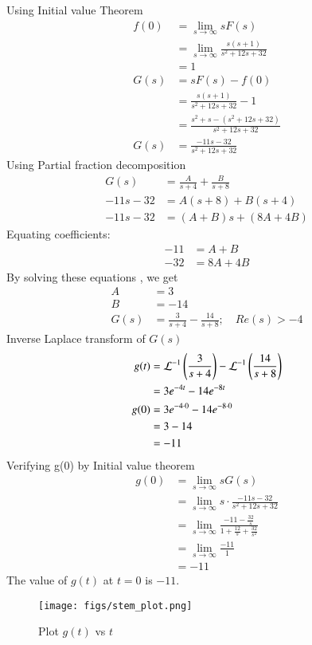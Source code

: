\documentclass[journal,12pt,twocolumn]{IEEEtran}
\theoremstyle{remark}
\begin{document}
Using Initial value Theorem 
\begin{align}
    f(0) &= \lim_{s \to \infty} sF(s) \\
         &= \lim_{s \to \infty} \frac{s(s+1)}{s^2 + 12s + 32} \\
         &= 1 \\
    G(s) &= sF(s) - f(0) \\
         &= \frac{s(s+1)}{s^2 + 12s + 32} - 1 \\
         &= \frac{s^2 + s - (s^2 + 12s + 32)}{s^2 + 12s + 32} \\
         G(s) &= \frac{-11s - 32}{s^2 + 12s + 32} 
\end{align}
Using Partial fraction decomposition 
\begin{align}
      G(s)   &= \frac{A}{s+4} + \frac{B}{s+8}  \\
    -11s - 32 &= A(s+8) + B(s+4) \\
    -11s - 32 &= (A + B)s + (8A + 4B)
\end{align}
Equating coefficients:
\begin{align}
     -11 &= A + B \\
    -32 &= 8A + 4B
\end{align}
By solving these equations , we get 
\begin{align}
    A &= 3 \\
    B &= -14 \\
    G(s) &=\frac{3}{s+4} - \frac{14}{s+8} ; \quad Re(s) > -4
\end{align}
Inverse Laplace transform of $G(s)$ 
\begin{align}
g(t) &=\mathcal{L}^{-1}\left(\frac{3}{s+4}\right) -\mathcal{L}^{-1}\left(\frac{14}{s+8}\right) \\
   &= 3e^{-4t} - 14e^{-8t} \\
g(0) &= 3e^{-4 \cdot 0} - 14e^{-8 \cdot 0} \\
         &= 3 - 14 \\
         &= -11
\end{align}
Verifying g(0) by Initial value theorem
\begin{align}
    g(0) &= \lim_{s \to \infty} sG(s) \\
         &= \lim_{s \to \infty} s \cdot \frac{-11s - 32}{s^2 + 12s + 32} \\
         &= \lim_{s \to \infty} \frac{-11 - \frac{32}{s}}{1 + \frac{12}{s} + \frac{32}{s^2}} \\
         &= \lim_{s \to \infty} \frac{-11}{1} \\
         &= -11
\end{align}
The value of $g(t)$ at $t=0$ is $-11$.
\begin{figure}[h!]
\centering
\texttt{[image: figs/stem\_plot.png]}
\caption{Plot $g(t)$ vs $t$ }
\label{fig:tansh_plott}
\end{figure}
\end{document}
